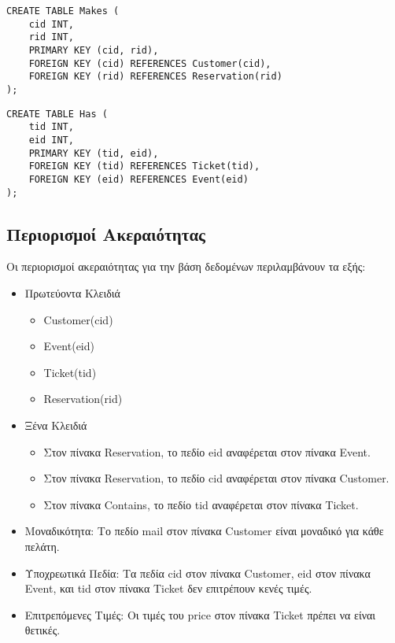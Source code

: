 \documentclass[a4paper, 11pt]{article}
\begin{document}
\begin{verbatim}
CREATE TABLE Makes (
    cid INT,
    rid INT,
    PRIMARY KEY (cid, rid),
    FOREIGN KEY (cid) REFERENCES Customer(cid),
    FOREIGN KEY (rid) REFERENCES Reservation(rid)
);
\end{verbatim}

\begin{verbatim}
CREATE TABLE Has (
    tid INT,
    eid INT,
    PRIMARY KEY (tid, eid),
    FOREIGN KEY (tid) REFERENCES Ticket(tid),
    FOREIGN KEY (eid) REFERENCES Event(eid)
);
\end{verbatim}
\subsection*{Περιορισμοί Ακεραιότητας}
Οι περιορισμοί ακεραιότητας για την βάση δεδομένων περιλαμβάνουν τα εξής:
\begin{itemize}
    \item Πρωτεύοντα Κλειδιά
    \begin{itemize}
        \item Customer(cid)
        \item Event(eid)
        \item Ticket(tid)
        \item Reservation(rid)
    \end{itemize}
    \item Ξένα Κλειδιά
    \begin{itemize}
        \item Στον πίνακα Reservation, το πεδίο eid αναφέρεται στον πίνακα Event.
        \item Στον πίνακα Reservation, το πεδίο cid αναφέρεται στον πίνακα Customer.
        \item Στον πίνακα Contains, το πεδίο tid αναφέρεται στον πίνακα Ticket.
    \end{itemize}
    \item Μοναδικότητα: Το πεδίο mail στον πίνακα Customer είναι μοναδικό για κάθε πελάτη.
    \item Υποχρεωτικά Πεδία: Τα πεδία cid στον πίνακα Customer, eid στον πίνακα Event, και tid στον πίνακα Ticket δεν επιτρέπουν κενές τιμές.
    \item Επιτρεπόμενες Τιμές: Οι τιμές του price στον πίνακα Ticket πρέπει να είναι θετικές.
\end{itemize}
\end{document}
